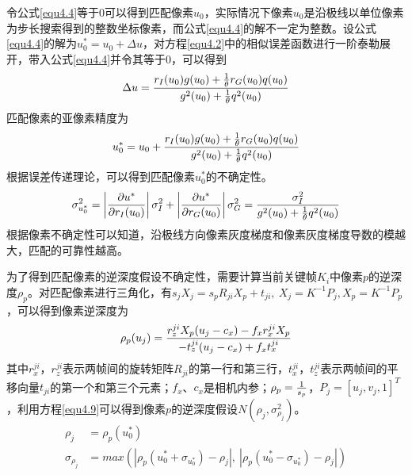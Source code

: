 令公式\eqref{equ4.4}等于$0$可以得到匹配像素$u_0$，实际情况下像素$u_0$是沿极线以单位像素为步长搜索得到的整数坐标像素，而公式\eqref{equ4.4}的解不一定为整数。设公式\eqref{equ4.4}的解为$u_0^*=u_0+\Delta u$，对方程\eqref{equ4.2}中的相似误差函数进行一阶泰勒展开，带入公式\eqref{equ4.4}并令其等于$0$，可以得到
\begin{equation}
\label{equ4.6}
\Delta u = {{ r_I(u_0) g(u_0)+ {1 \over \theta} r_G(u_0)q(u_0) } \over {g^2(u_0)+ { 1 \over \theta} q^2(u_0)}}
\end{equation}
匹配像素的亚像素精度为
\begin{equation}
\label{equ4.7}
u_0^* = u_0 + {{ r_I(u_0) g(u_0)+ {1 \over \theta} r_G(u_0)q(u_0) } \over {g^2(u_0)+ { 1 \over \theta} q^2(u_0)}}
\end{equation}
根据误差传递理论，可以得到匹配像素$u_0^*$的不确定性。
\begin{equation}
\label{equ4.8}
\sigma_{u_0^*}^2 = \left \vert { \partial u^* \over \partial r_I(u_0) }  \right \vert \sigma_I^2 + \left \vert { \partial u^* \over \partial r_G(u_0) }  \right \vert \sigma_G^2 = { \sigma_I^2 \over g^2(u_0) + {1 \over \theta} q^2(u_0) }
\end{equation}
根据像素不确定性可以知道，沿极线方向像素灰度梯度和像素灰度梯度导数的模越大，匹配的可靠性越高。

为了得到匹配像素的逆深度假设不确定性，需要计算当前关键帧$K_i$中像素$p$的逆深度$\rho_p$。对匹配像素进行三角化，有$s_jX_j = s_pR_{ji}X_p+t_{ji}, \  X_j = K^{-1}P_j, X_p = K^{-1}P_p$，可以得到像素逆深度为
\begin{equation}
\label{equ4.9}
\rho_p(u_j) = { r_z^{ji} X_p (u_j-c_x) - f_x r_x^{ji} X_p  \over - t_z^{ji}(u_j-c_x)+f_x t_x^{ji} }
\end{equation}
其中$r_x^{ji}$，$r_z^{ji}$表示两帧间的旋转矩阵$R_{ji}$的第一行和第三行，$t_x^{ji}$，$t_z^{ji}$表示两帧间的平移向量$t_{ji}$的第一个和第三个元素；$f_x$、$c_x$是相机内参；$\rho_p = { 1 \over s_p}$，$P_j= \left [ u_j, v_j, 1 \right ] ^T$，利用方程\eqref{equ4.9}可以得到像素$p$的逆深度假设$N(\rho_j, \sigma_{\rho_j}^2)$。
\begin{equation}
\label{equ4.10}
\begin{aligned}
 \rho_j &= \rho_p(u_0^*) \\ 
 \sigma_{\rho_j} &= max \left( \left \vert  \rho_p(u_0^*+\sigma_{u_0^*})-\rho_j \right \vert , \  \left \vert  \rho_p(u_0^*-\sigma_{u_0^*})-\rho_j \right \vert \right)
\end{aligned}
\end{equation}

